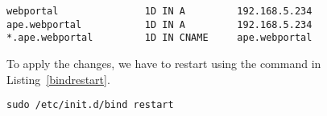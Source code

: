 \begin{lstlisting}[label=bindconf,caption=BIND configuration]
webportal               1D IN A         192.168.5.234
ape.webportal           1D IN A         192.168.5.234
*.ape.webportal         1D IN CNAME     ape.webportal
\end{lstlisting}

To apply the changes, we have to restart  using the command in
Listing~\vref{bindrestart}.

\begin{lstlisting}[label=bindrestart,caption=BIND restart command]
sudo /etc/init.d/bind restart
\end{lstlisting}


